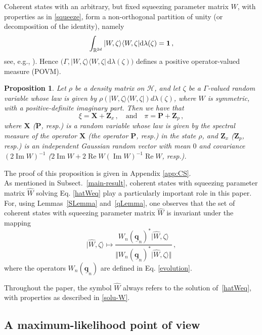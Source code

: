 \documentclass[11pt]{article}
\newtheorem{proposition}[theorem]{Proposition}
\newcommand{\ket}[1]{|{#1}\rangle}
\newcommand{\bra}[1]{\langle{#1}|}
\renewcommand{\Re}{\operatorname{Re}}
\renewcommand{\Im}{\operatorname{Im}}
\renewcommand{\d}{{\mathrm d}}
\begin{document}
Coherent states with an arbitrary, but fixed squeezing parameter matrix $W$, with properties as in \eqref{squeeze}, form a non-orthogonal partition of unity (or decomposition of the identity), namely
\begin{equation}
\label{coherent_identity}
\int_{\mathbb{R}^{2d}} \ket{W, \zeta}\bra{W, \zeta} \d\lambda(\zeta) = {\bf{1}}\,,
\end{equation}
 see, e.g., \cite[Theorem 8.85]{DerezinskiGerard}). Hence $\big(\Gamma, \ket{W, \zeta}\bra{W, \zeta}\,\d\lambda(\zeta)\big)$  defines a positive operator-valued measure (POVM). 
 
\begin{proposition}\label{prop:characterization_coherent_POVM}
	Let $\rho$ be a density matrix on $\mathcal{H}$, and let $\zeta$ be a $\Gamma$-valued random variable whose 
	law is given by $\rho(\ket{ W,\zeta}\bra{ W,\zeta})d\lambda(\zeta)$, where $W$ is symmetric, with a 
	positive-definite imaginary part. Then we have that
	$$\xi=\mathbf{X} +\mathbf Z_x\,, \quad \text{and}  \quad \pi=\mathbf{P} + \mathbf Z_p\,,$$
where $\mathbf{X}$ ($\mathbf{P}$, resp.) is a random variable whose law is given by the spectral measure of the operator 
$\mathbf X$ (the operator $\mathbf P$, resp.) in the state $\rho$, and $\mathbf Z_x$ ($\mathbf Z_p$, resp.) is an independent 
Gaussian random vector with mean $0$ and covariance $(2\Im W)^{-1}$ ($2\Im W + 2\Re W(\Im W)^{-1}\Re W$, resp.).
\end{proposition}
The proof of this proposition is given in Appendix \ref{app:CS}.\\

As mentioned in Subsect.~\ref{main-result}, coherent states with squeezing parameter matrix $\widehat{W}$ solving Eq. \eqref{hatWeq} play a particularly important role in this paper. For, using Lemmas~\ref{SLemma} and~\ref{qLemma}, one observes that the set of coherent states with squeezing parameter matrix $\widehat W$ is invariant under the mapping 
$$\ket{\widehat W,\zeta}\mapsto \frac{W_{n}(\underline{\mathbf{q}}_{n})^{*}\ket{\widehat W,\zeta}}{\Vert W_{n}(\underline{\mathbf{q}}_{n})^{*}\ket{\widehat W,\zeta} \Vert }\,,$$
 where the operators 
$W_{n}(\underline{\mathbf{q}}_{n})$ are defined in Eq. \eqref{evolution}.

Throughout the paper, the symbol $\widehat W$ always refers to the solution of~\eqref{hatWeq}, with properties as described in \eqref{solu-W}.

\subsection{A maximum-likelihood point of view}\label{max-likelyhood}
\end{document}
